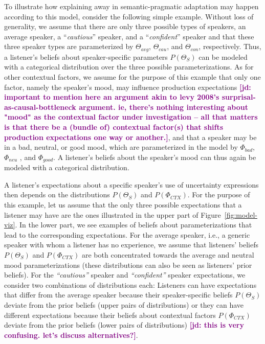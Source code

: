 \documentclass[man,floatsintext]{apa6}
\newcommand{\jd}[1]{\textcolor{Purple}{\bf [jd: #1]}}
\begin{document}
To illustrate how explaining away in semantic-pragmatic adaptation may happen according to this model, consider the following simple example. Without loss of generality, we assume that there are only three possible types of speakers, an average speaker, a ``\textit{cautious}'' speaker, and a ``\textit{confident}'' speaker and that these three speaker types are parameterized by $\Theta_{avg}$,  $\Theta_{cau}$, and  $\Theta_{con}$, respectively. Thus, a listener's beliefs about speaker-specific parameters $P(\Theta_S)$ can be modeled with a categorical distribution over the three possible parameterizations. As for other contextual factors, we assume for the purpose of this example that only one factor, namely the speaker's mood, may influence production expectations \jd{important to mention here an argument akin to levy 2008's surprisal-as-causal-bottleneck argument. ie, there's nothing interesting about "mood" as the contextual factor under investigation -- all that matters is that there be a (bundle of) contextual factor(s) that shifts production expectations one way or another.}, and that a speaker may be in a bad, neutral, or good mood, which are parameterized in the model by $\Phi_{bad}$, $\Phi_{neu}$ , and $\Phi_{good}$. A listener's beliefs about the speaker's mood can thus again be modeled with a categorical distribution.

A listener's expectations about a specific speaker's use of uncertainty expressions then depends on the distributions $P(\Theta_S)$ and $P(\Phi_{CTX})$. For the purpose of this example, let us assume that the only three possible expectations that a listener may have are the ones illustrated in the upper part of Figure~\ref{fig:model-viz}. In the lower part, we see examples of  beliefs about parameterizations that lead to the corresponding expectations. For the average speaker, i.e., a generic speaker with whom a listener has no experience, we assume that listeners' beliefs $P(\Theta_S)$ and $P(\Phi_{CTX})$ are both concentrated towards the average and neutral mood parameterizations (these distributions can also be seen as listeners' prior beliefs). For the \textit{``cautious''} speaker and \textit{``confident''} speaker expectations, we consider two combinations of distributions each: Listeners can have expectations that differ from the average speaker because their speaker-specific beliefs $P(\Theta_S)$ deviate from the prior beliefs (upper pairs of distributions) or they can have different expectations because their beliefs about contextual factors $P(\Phi_{CTX})$ deviate from the prior beliefs (lower pairs of distributions) \jd{this is very confusing. let's discuss alternatives?}.
\end{document}
